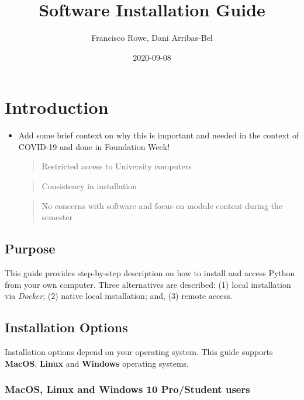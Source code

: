 \documentclass[
]{book}
\title{Software Installation Guide}
\author{Francisco Rowe, Dani Arribas-Bel}
\date{2020-09-08}
\begin{document}
\maketitle

{
\setcounter{tocdepth}{1}
\tableofcontents
}
\hypertarget{introduction}{%
\chapter{Introduction}\label{introduction}}

\begin{itemize}
\item
  Add some brief context on why this is important and needed in the context of COVID-19 and done in Foundation Week!

  \begin{quote}
  Restricted access to University computers
  \end{quote}

  \begin{quote}
  Consistency in installation
  \end{quote}

  \begin{quote}
  No concerns with software and focus on module content during the semester
  \end{quote}
\end{itemize}

\hypertarget{purpose}{%
\section{Purpose}\label{purpose}}

This guide provides step-by-step description on how to install and access Python from your own computer. Three alternatives are described: (1) local installation via \emph{Docker}; (2) native local installation; and, (3) remote access.

\hypertarget{installation-options}{%
\section{Installation Options}\label{installation-options}}

Installation options depend on your operating system. This guide supports \textbf{MacOS}, \textbf{Linux} and \textbf{Windows} operating systems.

\hypertarget{macos-linux-and-windows-10-prostudent-users}{%
\subsection{MacOS, Linux and Windows 10 Pro/Student users}\label{macos-linux-and-windows-10-prostudent-users}}
\end{document}
